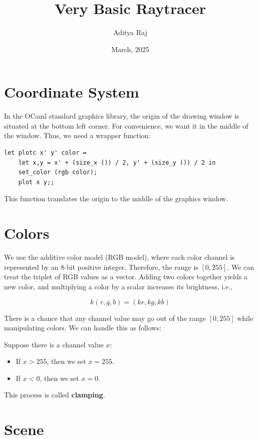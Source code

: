 \documentclass{article}
\title{Very Basic Raytracer}
\author{Aditya Raj}
\date{March, 2025}
\begin{document}
\maketitle

\tableofcontents

\section{Coordinate System}

In the OCaml standard graphics library, the origin of the drawing window is situated at the bottom left corner. For convenience, we want it in the middle of the window. Thus, we need a wrapper function:

\begin{verbatim}
let plotc x' y' color =
    let x,y = x' + (size_x ()) / 2, y' + (size_y ()) / 2 in 
    set_color (rgb color);
    plot x y;;
\end{verbatim}

This function translates the origin to the middle of the graphics window.

\section{Colors}

We use the additive color model (RGB model), where each color channel is represented by an 8-bit positive integer. Therefore, the range is $[0,255]$. We can treat the triplet of RGB values as a vector. Adding two colors together yields a new color, and multiplying a color by a scalar increases its brightness, i.e.,

$$k (r, g, b) = (kr, kg, kb)$$

There is a chance that any channel value may go out of the range $[0,255]$ while manipulating colors. We can handle this as follows:

Suppose there is a channel value $x$:
\begin{itemize}
    \item If $x > 255$, then we set $x = 255$.
    \item If $x < 0$, then we set $x = 0$.
\end{itemize}

This process is called \textbf{clamping}.

\section{Scene}
\end{document}
